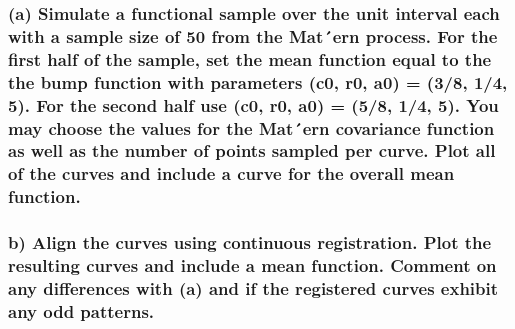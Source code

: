 \documentclass[
]{article}
\begin{document}
\hypertarget{a-simulate-a-functional-sample-over-the-unit-interval-each-with-a-sample-size-of-50-from-the-matern-process.-for-the-first-half-of-the-sample-set-the-mean-function-equal-to-the-the-bump-function-with-parameters-c0-r0-a0-38-14-5.-for-the-second-half-use-c0-r0-a0-58-14-5.-you-may-choose-the-values-for-the-matern-covariance-function-as-well-as-the-number-of-points-sampled-per-curve.-plot-all-of-the-curves-and-include-a-curve-for-the-overall-mean-function.}{%
\subsubsection{(a) Simulate a functional sample over the unit interval
each with a sample size of 50 from the Mat´ern process. For the first
half of the sample, set the mean function equal to the the bump function
with parameters (c0, r0, a0) = (3/8, 1/4, 5). For the second half use
(c0, r0, a0) = (5/8, 1/4, 5). You may choose the values for the Mat´ern
covariance function as well as the number of points sampled per curve.
Plot all of the curves and include a curve for the overall mean
function.}\label{a-simulate-a-functional-sample-over-the-unit-interval-each-with-a-sample-size-of-50-from-the-matern-process.-for-the-first-half-of-the-sample-set-the-mean-function-equal-to-the-the-bump-function-with-parameters-c0-r0-a0-38-14-5.-for-the-second-half-use-c0-r0-a0-58-14-5.-you-may-choose-the-values-for-the-matern-covariance-function-as-well-as-the-number-of-points-sampled-per-curve.-plot-all-of-the-curves-and-include-a-curve-for-the-overall-mean-function.}}

\hypertarget{b-align-the-curves-using-continuous-registration.-plot-the-resulting-curves-and-include-a-mean-function.-comment-on-any-differences-with-a-and-if-the-registered-curves-exhibit-any-odd-patterns.}{%
\subsubsection{b) Align the curves using continuous registration. Plot
the resulting curves and include a mean function. Comment on any
differences with (a) and if the registered curves exhibit any odd
patterns.}\label{b-align-the-curves-using-continuous-registration.-plot-the-resulting-curves-and-include-a-mean-function.-comment-on-any-differences-with-a-and-if-the-registered-curves-exhibit-any-odd-patterns.}}
\end{document}
